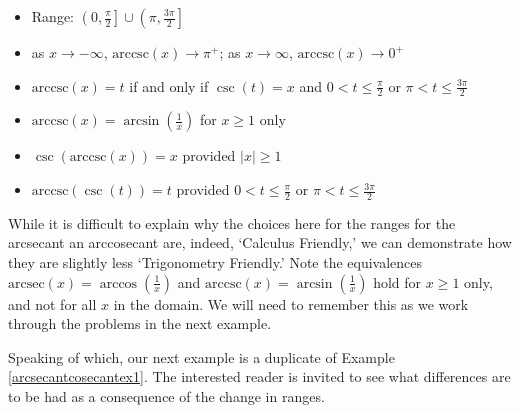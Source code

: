 {\begin{thm}
\begin{itemize}
\begin{itemize}
\item Range: $\left(0, \frac{\pi}{2} \right] \cup \left( \pi, \frac{3\pi}{2} \right]$

\item  as $x \rightarrow -\infty$, $\mbox{arccsc}(x) \rightarrow \pi^{+}$;  as $x \rightarrow \infty$, $\mbox{arccsc}(x) \rightarrow 0^{+}$

\item  $\mbox{arccsc}(x) = t$ if and only if $\csc(t) = x$ and $0 < t \leq \frac{\pi}{2}$ or $\pi < t \leq \frac{3\pi}{2}$ 

\item  $\mbox{arccsc}(x) = \arcsin\left(\frac{1}{x}\right)$ for $x \geq 1$ only %

\item  $\csc\left(\mbox{arccsc}(x)\right) = x$ provided $|x| \geq 1$

\item  $\mbox{arccsc}(\csc(t)) = t$ provided $0 < t \leq \frac{\pi}{2}$ or $\pi < t \leq \frac{3\pi}{2}$

\end{itemize}

\end{itemize}

\end{thm}

\ebm}

While it is difficult to explain why the choices here for the ranges for the arcsecant an arccosecant are, indeed, `Calculus Friendly,' we can demonstrate how they are slightly less `Trigonometry Friendly.'  Note the equivalences $\mbox{arcsec}(x) = \arccos\left(\frac{1}{x}\right)$ and $\mbox{arccsc}(x) = \arcsin\left(\frac{1}{x}\right)$  hold for $x \geq 1$ only, and not for all $x$ in the domain.  We will need to remember this as we work through the problems in the next example.

\smallskip

Speaking of which, our next example is a duplicate of Example \ref{arcsecantcosecantex1}.  The interested reader is invited to see what differences are to be had as a consequence of the change in ranges.

\smallskip


